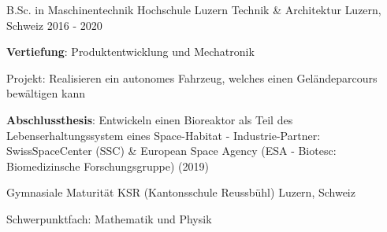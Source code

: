 

\begin{cventries}

\cventry
{B.Sc. in Maschinentechnik} %
{Hochschule Luzern Technik \& Architektur} %
{Luzern, Schweiz} %
{2016 - 2020} %
{
	\begin{cvitems} %
		\item {\textbf{Vertiefung}: Produktentwicklung und Mechatronik}
		\item {Projekt: Realisieren ein autonomes Fahrzeug, welches einen Geländeparcours bewältigen kann}
		\item {\textbf{Abschlussthesis}: Entwickeln einen Bioreaktor als Teil des Lebenserhaltungssystem eines Space-Habitat - \newline Industrie-Partner: \mbox{SwissSpaceCenter} (SSC) \& European Space Agency (ESA - Biotesc: Biomedizinsche Forschungsgruppe) (2019)}
	\end{cvitems}
}



  \cventry
    {Gymnasiale Maturität} %
    {KSR (Kantonsschule Reussbühl)} %
    {Luzern, Schweiz} %
    {} %
    {
      \begin{cvitems} %
        \item {Schwerpunktfach: Mathematik und Physik}
      \end{cvitems}
    }

\end{cventries}
